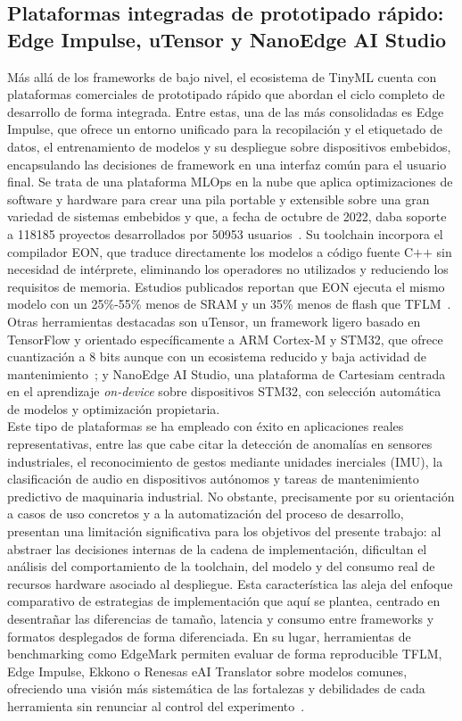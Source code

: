 \documentclass[a4paper,12pt,twoside,final]{book}
\begin{document}
\subsection{Plataformas integradas de prototipado rápido: Edge Impulse, uTensor y NanoEdge AI Studio}
Más allá de los frameworks de bajo nivel, el ecosistema de TinyML cuenta con plataformas comerciales de prototipado
rápido que abordan el ciclo completo de desarrollo de forma integrada. Entre estas, una de las más consolidadas es
Edge Impulse, que ofrece un entorno unificado para la recopilación y el etiquetado de datos, el entrenamiento de
modelos y su despliegue sobre dispositivos embebidos, encapsulando las decisiones de framework en una interfaz común
para el usuario final. Se trata de una plataforma MLOps en la nube que aplica optimizaciones de software y hardware
para crear una pila portable y extensible sobre una gran variedad de sistemas embebidos y que, a fecha de octubre de
2022, daba soporte a 118185 proyectos desarrollados por 50953 usuarios~\cite{hymel2021edgeimpulse}. Su toolchain
incorpora el compilador EON, que traduce directamente los modelos a código fuente C$+$$+$ sin necesidad de intérprete,
eliminando los operadores no utilizados y reduciendo los requisitos de memoria. Estudios publicados reportan que EON
ejecuta el mismo modelo con un 25\%-55\% menos de SRAM y un 35\% menos de flash que TFLM~\cite{lê2025tist}.\\

Otras herramientas destacadas son uTensor, un framework ligero basado en TensorFlow y orientado específicamente a
ARM Cortex-M y STM32, que ofrece cuantización a 8 bits aunque con un ecosistema reducido y baja actividad de
mantenimiento~\cite{somvanshi2025acm}; y NanoEdge AI Studio, una plataforma de Cartesiam centrada en el aprendizaje
\textit{on-device} sobre dispositivos STM32, con selección automática de modelos y optimización propietaria.\\

Este tipo de plataformas se ha empleado con éxito en aplicaciones reales representativas, entre las que cabe citar
la detección de anomalías en sensores industriales, el reconocimiento de gestos mediante unidades inerciales (IMU),
la clasificación de audio en dispositivos autónomos y tareas de mantenimiento predictivo de maquinaria industrial.
No obstante, precisamente por su orientación a casos de uso concretos y a la automatización del proceso de
desarrollo, presentan una limitación significativa para los objetivos del presente trabajo: al abstraer las
decisiones internas de la cadena de implementación, dificultan el análisis del comportamiento de la toolchain, del
modelo y del consumo real de recursos hardware asociado al despliegue. Esta característica las aleja del enfoque
comparativo de estrategias de implementación que aquí se plantea, centrado en desentrañar las diferencias de tamaño,
latencia y consumo entre frameworks y formatos desplegados de forma diferenciada. En su lugar, herramientas de
benchmarking como EdgeMark permiten evaluar de forma reproducible TFLM, Edge Impulse, Ekkono o Renesas eAI
Translator sobre modelos comunes, ofreciendo una visión más sistemática de las fortalezas y debilidades de cada
herramienta sin renunciar al control del experimento~\cite{hasanpour2025sysarc}.
\end{document}
